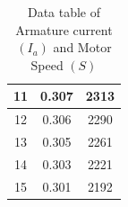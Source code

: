 \documentclass[a4paper,12pt]{article}
\begin{document}
\begin{table}[H]
\begin{subtable}[t]{1\textwidth}
\begin{tabular}{|c|c|c|}
	11          & 0.307                                                                        & 2313                                                                 \\ \hline
	12          & 0.306                                                                        & 2290                                                                 \\ \hline
	13          & 0.305                                                                        & 2261                                                                 \\ \hline
	14          & 0.303                                                                        & 2221                                                                 \\ \hline
	15          & 0.301                                                                        & 2192                                                                 \\ \hline
\end{tabular}
\caption{Data table of Armature current $(I_a)$ and Motor Speed $(S)$}
\end{subtable}

\end{table}
\end{document}
